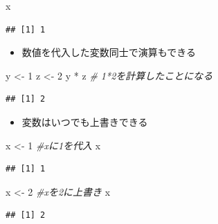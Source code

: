 \documentclass[
]{book}
\newenvironment{Shaded}{\begin{snugshade}}{\end{snugshade}}
\newcommand{\CommentTok}[1]{\textcolor[rgb]{0.56,0.35,0.01}{\textit{#1}}}
\newcommand{\DecValTok}[1]{\textcolor[rgb]{0.00,0.00,0.81}{#1}}
\newcommand{\NormalTok}[1]{#1}
\newcommand{\OtherTok}[1]{\textcolor[rgb]{0.56,0.35,0.01}{#1}}
\newcommand{\SpecialCharTok}[1]{\textcolor[rgb]{0.00,0.00,0.00}{#1}}
\providecommand{\tightlist}{%
  \setlength{\itemsep}{0pt}\setlength{\parskip}{0pt}}
\begin{document}
\begin{Shaded}
\begin{Highlighting}[]
\NormalTok{x}
\end{Highlighting}
\end{Shaded}

\begin{verbatim}
## [1] 1
\end{verbatim}

\begin{itemize}
\tightlist
\item
  数値を代入した変数同士で演算もできる
\end{itemize}

\begin{Shaded}
\begin{Highlighting}[]
\NormalTok{y }\OtherTok{\textless{}{-}} \DecValTok{1} 
\NormalTok{z }\OtherTok{\textless{}{-}} \DecValTok{2}
\NormalTok{y }\SpecialCharTok{*}\NormalTok{ z }\CommentTok{\# 1*2を計算したことになる}
\end{Highlighting}
\end{Shaded}

\begin{verbatim}
## [1] 2
\end{verbatim}

\begin{itemize}
\tightlist
\item
  変数はいつでも上書きできる
\end{itemize}

\begin{Shaded}
\begin{Highlighting}[]
\NormalTok{x }\OtherTok{\textless{}{-}} \DecValTok{1} \CommentTok{\#xに1を代入}
\NormalTok{x}
\end{Highlighting}
\end{Shaded}

\begin{verbatim}
## [1] 1
\end{verbatim}

\begin{Shaded}
\begin{Highlighting}[]
\NormalTok{x }\OtherTok{\textless{}{-}} \DecValTok{2} \CommentTok{\#xを2に上書き}
\NormalTok{x}
\end{Highlighting}
\end{Shaded}

\begin{verbatim}
## [1] 2
\end{verbatim}
\end{document}
